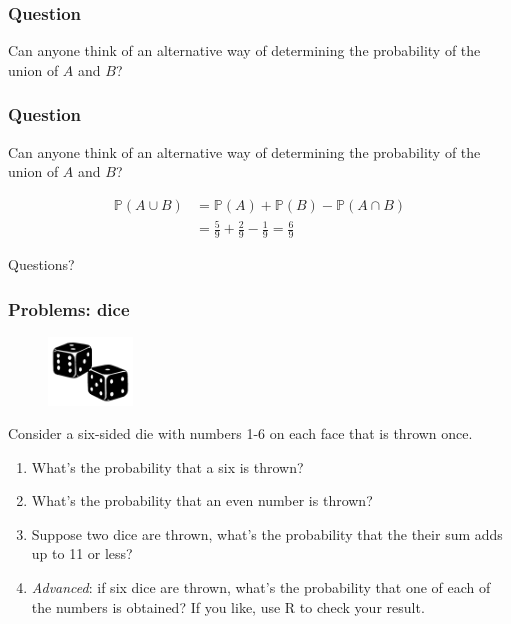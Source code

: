 \documentclass{beamer}
\begin{document}
	\begin{frame}
		\frametitle{Question}
		
		\Large Can anyone think of an alternative way of determining the probability of the union of $A$ and $B$?
		
	\end{frame}

	\begin{frame}
		\frametitle{Question}
		
		\Large Can anyone think of an alternative way of determining the probability of the union of $A$ and $B$?
		
		\begin{align}
			\mathbb{P}(A \cup B) &= \mathbb{P}(A) + \mathbb{P}(B) - \mathbb{P}(A \cap B)\\
			&= \frac{5}{9} + \frac{2}{9} - \frac{1}{9} = \frac{6}{9}
		\end{align}
		
		
	\end{frame}
	
	
	\begin{frame}
		\Large Questions?
	\end{frame}
	
	
	\begin{frame}
		\frametitle{Problems: dice}
		
		\begin{figure}[ht]
			\centerline{\includegraphics[width=0.2\textwidth]{./figures/dice.png}}
		\end{figure}
	
	Consider a six-sided die with numbers 1-6 on each face that is thrown once.
		
		\begin{enumerate}
			\item What's the probability that a six is thrown?
			\item What's the probability that an even number is thrown?
			\item Suppose two dice are thrown, what's the probability that the their sum adds up to 11 or less?
			\item \textit{Advanced}: if six dice are thrown, what's the probability that one of each of the numbers is obtained? If you like, use R to check your result.
		\end{enumerate}
		
	\end{frame}
\end{document}
